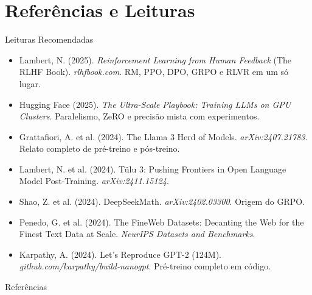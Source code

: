 \documentclass[aspectratio=169, xcolor=dvipsnames]{beamer}
\begin{document}
  \section*{Referências e Leituras}

  \begin{frame}{Leituras Recomendadas}
    \leiturasize
    \begin{itemize}
      \item Lambert, N. (2025). \textit{Reinforcement Learning from Human Feedback} (The RLHF Book). \textit{rlhfbook.com}. RM, PPO, DPO, GRPO e RLVR em um só lugar.
      \item Hugging Face (2025). \textit{The Ultra-Scale Playbook: Training LLMs on GPU Clusters}. Paralelismo, ZeRO e precisão mista com experimentos.
      \item Grattafiori, A. et al. (2024). The Llama 3 Herd of Models. \textit{arXiv:2407.21783}. Relato completo de pré-treino e pós-treino.
      \item Lambert, N. et al. (2024). Tülu 3: Pushing Frontiers in Open Language Model Post-Training. \textit{arXiv:2411.15124}.
      \item Shao, Z. et al. (2024). DeepSeekMath. \textit{arXiv:2402.03300}. Origem do GRPO.
      \item Penedo, G. et al. (2024). The FineWeb Datasets: Decanting the Web for the Finest Text Data at Scale. \textit{NeurIPS Datasets and Benchmarks}.
      \item Karpathy, A. (2024). Let's Reproduce GPT-2 (124M). \textit{github.com/karpathy/build-nanogpt}. Pré-treino completo em código.
    \end{itemize}
  \end{frame}

  \begin{frame}[allowframebreaks]{Referências}
    \sloppy
    \printbibliography[heading=none]
  \end{frame}
\end{document}
